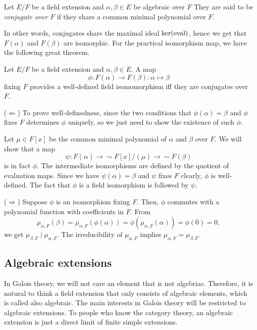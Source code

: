 \documentclass{../exp}
\begin{document}
\begin{rd}
\begin{defn}
Let $E/F$ be a field extension and $\alpha,\beta\in E$ be algebraic over $F$
They are said to be \emph{conjugate over $F$} if they share a common minimal polynomial over $F$.
\end{defn}

In other words, conjugates share the maximal ideal $\ker(\operatorname{eval})$, hence we get that $F(\alpha)$ and $F(\beta)$ are isomorphic.
For the practical isomorphism map, we have the following great theorem.

\begin{thm}
Let $E/F$ be a field extension and $\alpha,\beta\in E$.
A map
\[\phi:F(\alpha)\to F(\beta):\alpha\mapsto\beta\]
fixing $F$ provides a well-defined field isomomorphism iff they are conjugates over $F$.
\end{thm}
\begin{pf}
($\Leftarrow$)
To prove well-definedness, since the two conditions that $\phi(\alpha)=\beta$ and $\phi$ fixes $F$ determines $\phi$ uniquely, so we just need to show the existence of such $\phi$.

Let $\mu\in F[x]$ be the common minimal polynomial of $\alpha$ and $\beta$ over $F$.
We will show that a map
\[\psi:F(\alpha)\to{\sim}F[x]/(\mu)\to{\sim}F(\beta)\]
is in fact $\phi$.
The intermediate isomorphisms are defined by the quotient of evaluation maps.
Since we have $\psi(\alpha)=\beta$ and $\psi$ fixes $F$ clearly, $\phi$ is well-defined.
The fact that $\phi$ is a field isomorphism is followed by $\psi$.

($\Rightarrow$)
Suppose $\phi$ is an isomorphism fixing $F$.
Then, $\phi$ commutes with a polynomial function with coefficients in $F$.
From
\[\mu_{\alpha,F}(\beta)=\mu_{\alpha,F}(\phi(\alpha))=\phi(\mu_{\alpha,F}(\alpha))=\phi(0)=0,\]
we get $\mu_{\beta,F}\mid\mu_{\alpha,F}$.
The irreducibility of $\mu_{\alpha,F}$ implies $\mu_{\alpha,F}=\mu_{\beta,F}$.
\end{pf}






\subsection{Algebraic extensions}

In Galois theory, we will not care an element that is not algebriac.
Therefore, it is natural to think a field extension that only consists of algebraic elements, which is called also algebraic.
The main interests in Galois theory will be restricted to algebraic extensions.
To people who know the category theory, an algebraic extension is just a direct limit of finite simple extensions.


\end{rd}
\end{document}
